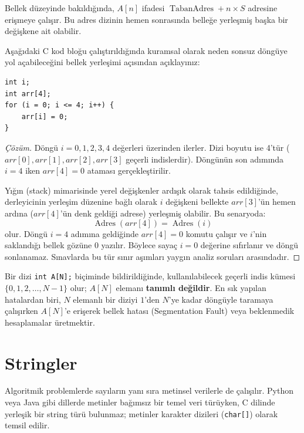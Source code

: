 Bellek düzeyinde bakıldığında, $A[n]$ ifadesi $\operatorname{TabanAdres} + n \times S$ adresine erişmeye çalışır. Bu adres dizinin hemen sonrasında belleğe yerleşmiş başka bir değişkene ait olabilir.

\begin{example}
Aşağıdaki C kod bloğu çalıştırıldığında kuramsal olarak neden sonsuz döngüye yol açabileceğini bellek yerleşimi açısından açıklayınız:
\begin{lstlisting}[language=CTemel]
int i;
int arr[4];
for (i = 0; i <= 4; i++) {
    arr[i] = 0;
}
\end{lstlisting}
\end{example}

\begin{proof}[Çözüm]
Döngü $i = 0, 1, 2, 3, 4$ değerleri üzerinden ilerler. Dizi boyutu ise 4'tür ($arr[0], arr[1], arr[2], arr[3]$ geçerli indislerdir). Döngünün son adımında $i = 4$ iken $arr[4] = 0$ ataması gerçekleştirilir.

Yığın (stack) mimarisinde yerel değişkenler ardışık olarak tahsis edildiğinde, derleyicinin yerleşim düzenine bağlı olarak $i$ değişkeni bellekte $arr[3]$'ün hemen ardına ($arr[4]$'ün denk geldiği adrese) yerleşmiş olabilir. Bu senaryoda:
\[
\operatorname{Adres}(arr[4]) = \operatorname{Adres}(i)
\]
olur. Döngü $i=4$ adımına geldiğinde $arr[4] = 0$ komutu çalışır ve $i$'nin saklandığı bellek gözüne $0$ yazılır. Böylece sayaç $i = 0$ değerine sıfırlanır ve döngü sonlanamaz. Sınavlarda bu tür sınır aşımları yaygın analiz soruları arasındadır.
\end{proof}

\begin{caution}
Bir dizi \texttt{int A[N];} biçiminde bildirildiğinde, kullanılabilecek geçerli indis kümesi $\{0, 1, 2, \dots, N-1\}$ olur; $A[N]$ elemanı \textbf{tanımlı değildir}. En sık yapılan hatalardan biri, $N$ elemanlı bir diziyi $1$'den $N$'ye kadar döngüyle taramaya çalışırken $A[N]$'e erişerek bellek hatası (Segmentation Fault) veya beklenmedik hesaplamalar üretmektir.
\end{caution}

\section{Stringler}

Algoritmik problemlerde sayıların yanı sıra metinsel verilerle de çalışılır. Python veya Java gibi dillerde metinler bağımsız bir temel veri türüyken, C dilinde yerleşik bir string türü bulunmaz; metinler karakter dizileri (\texttt{char[]}) olarak temsil edilir.

